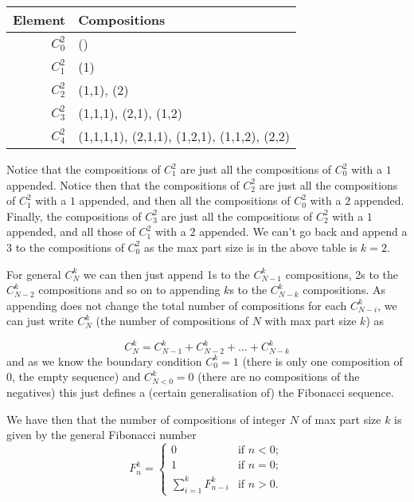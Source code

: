 \documentclass[hidelinks]{article}
\begin{document}
\begin{center}
	\begin{tabular}{| r | l |}
		\hline
		Element & Compositions \\ [0.5ex]
		\hline
		$C_0^2$ & ()\\
		$C_1^2$ & (1) \\
		$C_2^2$ & (1,1), (2)\\
		$C_3^2$ & (1,1,1), (2,1), (1,2) \\ 
		$C_4^2$ & (1,1,1,1), (2,1,1), (1,2,1), (1,1,2), (2,2) \\
		\hline
	\end{tabular}
\end{center}

Notice that the compositions of $C_1^2$ are just all the compositions of $C_0^2$ with a $1$ appended. Notice then that the compositions of $C_2^2$ are just all the compositions of $C_1^2$ with a $1$ appended, and then all the compositions of $C_0^2$ with a $2$ appended.  Finally, the compositions of $C_3^2$ are just all the compositions of $C_2^2$ with a $1$ appended, and all those of $C_1^2$ with a $2$ appended. We can't go back and append a $3$ to the compositions of $C_0^2$ as the max part size is in the above table is $k=2$.

For general $C_N^k$ we can then just append 1s to the $C_{N-1}^k$ compositions, 2s to the $C_{N-2}^k$ compositions and so on to appending $k$s to the $C_{N-k}^k$ compositions.  As appending does not change the total number of compositions for each $C_{N-i}^k$, we can just write $C_N^k$ (the number of compositions of $N$ with max part size $k$) as 

\begin{equation}
C_N^k = C_{N-1}^k + C_{N-2}^k + \dots + C_{N-k}^k
\end{equation}
and as we know the boundary condition $C^k_0=1$  (there is only one composition of 0, the empty sequence) and $C^k_{N<0}=0$ (there are no compositions of the negatives) this just defines a (certain generalisation of) the Fibonacci sequence. 

We have then that the number of compositions of integer $N$ of max part size $k$ is given by the general Fibonacci number
\begin{equation}
F_n^k = 
\begin{cases}
0 & \text{if }n<0; \\
1 & \text{if }n=0; \\
\sum_{i=1}^kF^k_{n-i} & \text{if }n>0.
\end{cases}
\end{equation}
\end{document}
